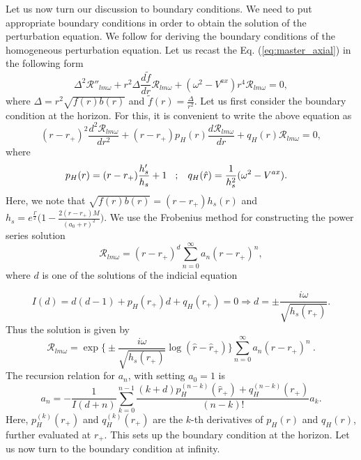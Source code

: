 \documentclass[11pt]{article}
\begin{document}
Let us now turn our discussion to boundary conditions. We need to put appropriate boundary conditions in order to obtain the solution of the perturbation equation. We follow \cite{Pani} for deriving the boundary conditions of the homogeneous perturbation equation. Let us recast the Eq. (\ref{eq:master_axial}) in the following form
\begin{equation}
\Delta^{2}\mathcal{R}''_{lm\omega}+r^{2}\Delta \frac{d\tilde f}{dr} \mathcal{R}_{lm\omega}+(\omega^{2}-V^{ax})r^{4}\mathcal{R}_{lm\omega} = 0,\label{sn1}
\end{equation}
where $\Delta=r^{2}\sqrt{f(r)b(r)}$ and $\tilde{f}(r)=\frac{\Delta}{r^{2}}$. Let us first consider the boundary condition at the horizon. For this, it is convenient to write the above equation as
\begin{equation}
(r-r_+)^2\frac{d^2\mathcal{R}_{lm\omega}}{dr^2} + (r-r_+) p_H(r)\frac{d\mathcal{R}_{lm\omega}}{dr} + q_H(r)\mathcal{R}_{lm\omega}=0,
\end{equation}
where 
\begin{align}
p_H(r) &=(r-r_{+}) \frac{h_{s}'}{h_{s}}+1 \hspace{3mm} ; \hspace{3mm}
q_H(\hat{r}) = \frac{1}{h_{s}^{2}}(\omega^{2}-V^{ax}) .
\end{align}
Here, we note that $\sqrt{f(r)b(r)} = (r-r_{+})h_{s}(r)$ and $h_{s}=e^{\frac{\Gamma}{2}}\Big(1-\frac{2(r-r_{+})M}{(a_{0}+r)^{2}}\Big)$. We use the Frobenius method for constructing the power series solution
\begin{equation}\label{bc_axial_horizon}
\mathcal{R}_{lm\omega} = (r-r_+)^d \displaystyle\sum_{n=0}^{\infty} a_n (r-r_+)^n,
\end{equation}
where $d$ is one of the solutions of the indicial equation

\begin{equation}
I(d) = d(d-1) + p_H(r_+) d + q_H(r_+) =0 \Longrightarrow d = \pm\frac{i\omega}{\sqrt{h_{s}(r_{+})}}.
\end{equation}
Thus the solution is given by
\begin{equation}
\mathcal{R}_{lm\omega}=\exp\bigg\{\pm \frac{i\omega}{\sqrt{h_{s}(r_{+})}} \log(\hat{r} - \hat{r}_+)\bigg\} \displaystyle \sum_{n=0}^{\infty} 
a_n (r-r_+)^n \label{eq:BCHor} \ .
\end{equation}
The recursion relation for $a_n$, with setting $a_{0}=1$ is
\begin{equation}
a_n = - \frac{1}{I(d+n)}  \displaystyle\sum_{k=0}^{n-1}\frac{(k+d)p_H^{(n-k)}(\hat{r}_+) +q_H^{(n-k)}(r_+)}{(n-k)!} a_k .
\end{equation}
Here, $p_H^{(k)}(r_+) $ and $q_H^{(k)}(r_+) $ are the $k$-th derivatives of $p_H(r)$ and $q_H(r)$, further evaluated at $r_+$. This sets up the boundary condition at the horizon. Let us now turn to the boundary condition at infinity.
\end{document}
